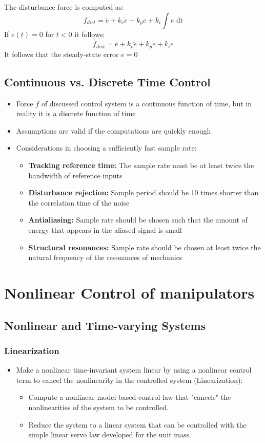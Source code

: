\documentclass[10pt,a4paper]{article}
\begin{document}
The disturbance force is computed as:
$$
	f_{dist} = \ddot e + k_v \dot e + k_p e + k_i \int e \textrm{ dt}
$$
If $e(t) = 0$ for $t < 0$ it follows:
$$
	\dot f_{dist} = \dddot{e} + k_v \ddot e + k_p \dot e + k_i e
$$
It follows that the steady-state error $e = 0$


\subsection{Continuous vs. Discrete Time Control}
\begin{itemize}
	\item Force $f$ of discussed control system is a continuous function of time, but in reality it is a discrete function of time
	\item Assumptions are valid if the computations are quickly enough
	\item Considerations in choosing a sufficiently fast sample rate:
	\begin{itemize}
		\item \textbf{Tracking reference time:} The sample rate must be at least twice the bandwidth of reference inputs
		\item \textbf{Disturbance rejection:} Sample period should be 10 times shorter than the correlation time of the noise
		\item \textbf{Antialiasing:} Sample rate should be chosen such that the amount of energy that appears in the aliased signal is small
		\item \textbf{Structural resonances:} Sample rate should be chosen at least twice the natural frequency of the resonances of mechanics
	\end{itemize}
\end{itemize}


\section{Nonlinear Control of manipulators}
\subsection{Nonlinear and Time-varying Systems}
\subsubsection{Linearization}
\begin{itemize}
	\item Make a nonlinear time-invariant system linear by using a nonlinear control term to cancel the nonlinearity in the controlled system (Linearization):
	\begin{itemize}
		\item Compute a nonlinear model-based control law that "cancels" the nonlinearities of the system to be controlled.
		\item Reduce the system to a linear system that can be controlled with the simple linear servo law developed for the unit mass.		
	\end{itemize}
\end{itemize}
\end{document}
